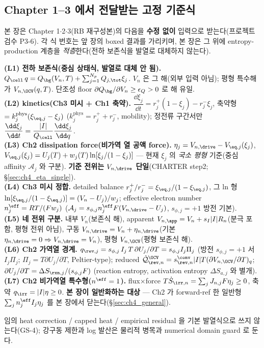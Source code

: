 \subsection{Chapter 1--3 에서 전달받는 고정 기준식}\label{sec:ch4_inherit}
본 장은 Chapter 1$\cdot$2$\cdot$3(RB 재구성본)의 다음을 \textbf{수정 없이} 입력으로 받는다(프로젝트 검수 P3-6).
각 식 번호는 앞 장의 boxed 결과를 가리키며, 본 장은 그 위에 entropy-production 계층을 \emph{적층}한다(전하
보존식을 발열로 대체하지 않는다).
\begin{linkbox}
\textbf{(L1) 전하 보존식(중심 상태식, 발열로 대체 안 됨).} $Q_\cell\,q=Q_\bg(V_n,T)+\sum_{j=1}^{N_p}Q_{j,\tot}\xi_j$.
$V_n$ 은 그 해(외부 입력 아님); 평형 특수해가 $V_{n,\OCV}(q,T)$. 단조성 floor $\partial Q_\bg/\partial V_n\ge\epsilon_Q>0$
로 해 유일.\\
\textbf{(L2) kinetics(Ch3 미시 + Ch1 축약).} $\dfrac{\dd\xi_j}{\dd t}=r_j^+(1-\xi_j)-r_j^-\xi_j$, 축약형
$=k_j^{\mathrm{phys}}(\xi_{\eq,j}-\xi_j)$ ($k_j^{\mathrm{phys}}=r_j^++r_j^-$, mobility); 정전류 구간서만
$\dfrac{\dd\xi_j}{\dd t}=\dfrac{|I|}{Q_\cell}\dfrac{\dd\xi_j}{\dd q}$.\\
\textbf{(L3) Ch2 dissipation force(비가역 열 공액 force).} $\eta_j=V_{n,\drive}-V_{\eq,j}(\xi_j)$,
$V_{\eq,j}(\xi_j)=U_j(T)+w_j(T)\ln[\xi_j/(1-\xi_j)]$ — 현재 $\xi_j$ 의 \emph{국소 평형} 기준(중심 affinity
$\mathcal A_j$ 와 구분). \textbf{기준 전위는 $V_{n,\drive}$ 단일}(CHARTER step2; \S\ref{sec:ch4_eta_single}).\\
\textbf{(L4) Ch3 미시 정합.} detailed balance $r_j^+/r_j^-=\xi_{\eq,j}/(1-\xi_{\eq,j})$, 그 ln 형
$\ln[\xi_{\eq,j}/(1-\xi_{\eq,j})]=(V_n-U_j)/w_j$; effective electron number $n_j^{\eff}=RT/(Fw_j)$ ($\mathcal A_j
=s_{\phi,j}n_j^{\eff}F(V_{n,\drive}-U_j)$, $s_{\phi,j}=+1$ 방전 기본).\\
\textbf{(L5) 네 전위 구분.} 내부 $V_n$(보존식 해), apparent $V_{n,\app}=V_n+s_I|I|R_n$(분극 포함, 평형 전위
아님), 구동 $V_{n,\drive}=V_n+\eta_{n,\drive}$(기본 $\eta_{n,\drive}=0\Rightarrow V_{n,\drive}=V_n$), 평형
$V_{n,\OCV}$(평형 보존식 해).\\
\textbf{(L6) Ch2 가역열 경계.} $q_{\rev,j}=s_{\phi,j}\,I_j\,T\,\partial U_j/\partial T=s_{\phi,j}I_j\Pi_j$
(방전 $s_{\phi,j}=+1$ 서 $I_j\Pi_j$; $\Pi_j=T\partial U_j/\partial T$, Peltier-type); reduced $\dot{\mathcal Q}_{\rev,n}^{\OCV}=s_{\rev,n}^{\conv}|I|T(\partial V_{n,\OCV}/\partial T)_q$;
$\partial U_j/\partial T=\Delta S_{\rxn,j}/(s_{\phi,j}F)$ (reaction entropy, activation entropy $\Delta S_{a,j}$
와 별개).\\
\textbf{(L7) Ch2 비가역열 특수형($n^{\eff}=1$).} flux$\times$force $T\dot S_{\irr,n}=\sum_j J_{n,j}F\eta_j\ge0$,
축약 $q_\irr=|I|\eta\ge0$. \textbf{본 장이 일반화하는 대상} — Ch2 가 forward-ref 한 일반형 $\sum_j n_j^{\eff}I_j\eta_j$
를 본 장에서 닫는다(\S\ref{sec:ch4_general}).
\end{linkbox}
임의 heat correction / capped heat / empirical residual 을 기본 발열식으로 쓰지 않는다(GS-4); 강구동 제한과
log 발산은 물리적 병목과 numerical domain guard 로 둔다.

